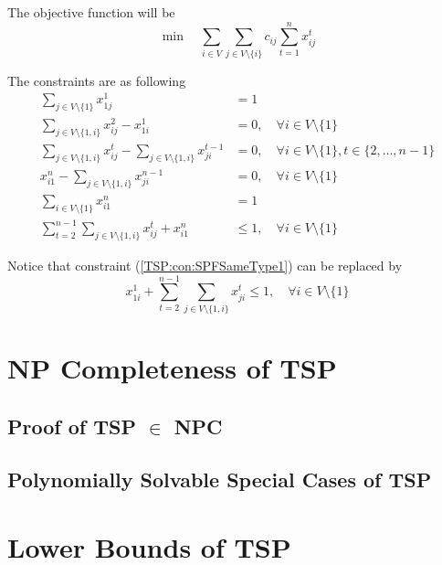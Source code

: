 					The objective function will be
					\begin{equation}
						\min \quad \sum_{i \in V}\sum_{j \in V\setminus \{i\}} c_{ij} \sum_{t = 1}^n x_{ij}^t
					\end{equation}

					The constraints are as following
					\begin{align}
						\sum_{j \in V \setminus \{1\}} x_{1j}^1 &= 1 \label{TSP:con:SPFStart}\\
						\sum_{j \in V \setminus \{1, i\}} x_{ij}^2 - x_{1i}^1 &= 0, \quad \forall i \in V \setminus \{1\} \label{TSP:con:SPFFirstLayer}\\
						\sum_{j \in V \setminus \{1, i\}} x_{ij}^t - \sum_{j \in V \setminus \{1, i\}} x_{ji}^{t - 1} &= 0, \quad \forall i \in V \setminus \{1\}, t \in \{2, \dots, n - 1\} \label{TSP:con:SPFTthLayer}\\
						x_{i1}^n - \sum_{j \in V \setminus \{1, i\}} x_{ji}^{n - 1} &= 0, \quad \forall i \in V \setminus \{1\} \label{TSP:con:SPFLastLayer}\\
						\sum_{i \in V \setminus \{1\}} x_{i1}^n &= 1 \label{TSP:con:SPFEnd}\\
						\sum_{t = 2}^{n - 1}\sum_{j \in V \setminus \{1, i\}} x_{ij}^t + x_{i1}^n & \le 1, \quad \forall i \in V \setminus \{1\} \label{TSP:con:SPFSameType1}
					\end{align}

					Notice that constraint (\ref{TSP:con:SPFSameType1}) can be replaced by
					\begin{equation}
						x_{1i}^1 + \sum_{t = 2}^{n - 1}\sum_{j \in V \setminus \{1, i\}} x_{ji}^t \le 1, \quad \forall i \in V \setminus \{1\} \label{TSP:con:SPFSameType2}
					\end{equation}

			\section{NP Completeness of TSP}
				\subsection{Proof of TSP $\in$ NPC}

				\subsection{Polynomially Solvable Special Cases of TSP}

			\section{Lower Bounds of TSP}
